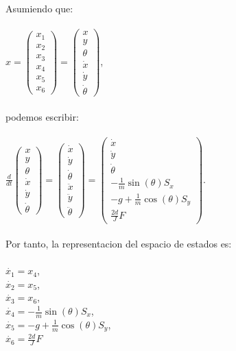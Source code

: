 \documentclass{article}
\begin{document}
\begin{itemize}
Asumiendo que:\\\\
		$x = 
			\begin{pmatrix}
				 x_1\\x_2\\x_3\\x_4\\x_5\\x_6
			\end{pmatrix}
		 		= 
			\begin{pmatrix}
				 x\\y\\\theta\\\dot{x}\\\dot{y}\\\dot{\theta}
			\end{pmatrix}$,\\\\
podemos escribir:\\\\
		$\frac{d}{dt}
			\begin{pmatrix}
				 x\\y\\\theta\\\dot{x}\\\dot{y}\\\dot{\theta}
			\end{pmatrix}
				=
			\begin{pmatrix}
				 \dot{x}\\\dot{y}\\\dot{\theta}\\\ddot{x}\\\ddot{y}\\\ddot{\theta}
			\end{pmatrix}
				=
			\begin{pmatrix}
				 \dot{x}\\\dot{y}\\\dot{\theta}\\-\frac{1}{m}\sin(\theta)S_x\\-g+\frac{1}{m}\cos (\theta)S_y\\\frac{2d}{J}F
			\end{pmatrix}$.\\\\
Por tanto, la representacion del espacio de estados es:\\\\
	$\dot{x_1}=x_4$,\\
	$\dot{x_2}=x_5$,\\
	$\dot{x_3}=x_6$,\\
	$\dot{x_4}=-\frac{1}{m}\sin(\theta)S_x$,\\
	$\dot{x_5}=-g+\frac{1}{m}\cos (\theta)S_y$,\\
	$\dot{x_6}=\frac{2d}{J}F$\\	

\end{itemize}
\end{document}
